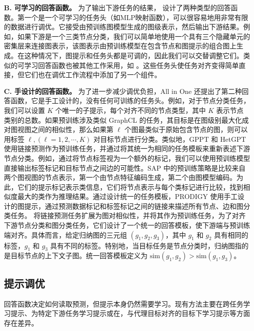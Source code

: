 \textbf{B. 可学习的回答函数。}
为了输出下游任务的结果，\citet{sun2023all} 设计了两种类型的回答函数。第一个是一个可学习的任务头（如MLP映射函数），可以很容易地用非常有限的数据进行调优。它接受由预训练图模型生成的图级表示，然后输出下游结果。例如，如果下游是一个三类节点分类，我们可以简单地使用一个具有三个隐藏单元的密集层来连接图表示，该图表示由预训练模型在包含节点和图提示的组合图上生成。在这种情况下，图提示和任务头都是可调的，因此我们可以交替调整它们。类似的可学习回答函数也被其他工作采用，如 \cite{fang2022prompt, fang2023universal,tan2023virtual}。这些任务头使任务对齐变得简单直接，但它们也在调优工作流程中添加了另一个组件。


\textbf{C. 手设计的回答函数。}
为了进一步减少调优负担，All in One \cite{sun2023all} 还提出了第二种回答函数，它是手工设计的，没有任何可训练的任务头。例如，对于节点分类任务，我们可以设置 $K$ 个唯一的子提示，每个对齐不同的节点类型，其中 $K$ 表示节点类别的总数。如果预训练涉及类似 GraphCL \cite{you2020graph} 的任务，其目标是在图级别最大化成对图视图之间的相似性，那么如果第 $\ell$ 个图最类似于原始包含节点的图，则可以用标签 $\ell, (\ell=1,2,\cdots,K)$ 对目标节点进行分类。类似地，GPPT \cite{sun2022gppt} 和 HetGPT \cite{ma2023hetgpt} 使用链接预测作为预训练任务，并通过将其统一为相同的任务模板来重新表述下游节点分类。例如，通过将节点标签视为一个额外的标记，我们可以使用预训练模型直接输出标签标记和目标节点之间边的可能性。SAP \cite{ge2023enhancing} 中的预训练策略是比较来自两个图视图的节点表示，第一个由节点特征编码生成，第二个由图模型编码。为此，它们的提示标记表示类信息，它们将节点表示与每个类标记进行比较，找到相似度最大的类作为推理结果。通过设计统一的任务模板，PRODIGY \cite{huang2023prodigy} 使用手工设计的图提示，通过预测数据标记和标签标记之间的链接来描述所有节点、边和图分类任务。\citet{liu2023graphprompt} 将链接预测任务扩展为图对相似性，并将其作为预训练任务，为了对齐下游节点分类和图分类任务，它们设计了一个统一的回答模板，使下游端与预训练端对齐。具体而言，给定归纳图的三元组 $(g_1,g_2, g_3)$，其中 $g_1$ 和 $g_2$ 具有相同的标签，$g_1$ 和 $g_3$ 具有不同的标签。特别地，当目标任务是节点分类时，归纳图指的是目标节点的上下文子图。统一回答模板定义为 $\text{sim}(g_1,g_2)>\text{sim}(g_1,g_3)$。


\subsection{提示调优}\label{sec:pt}

\textit{}

回答函数决定如何读取预测，但提示本身仍然需要学习。现有方法主要在跨任务学习提示、为特定下游任务学习提示或在，与代理目标对齐的目标下学习提示等方面存在差异。

